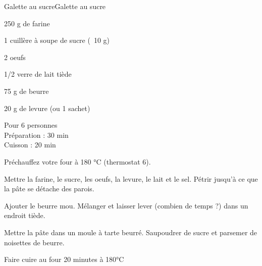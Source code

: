 \begin{recette}{Galette au sucre}{Galette au sucre}

\begin{ingredients}
250 g de farine\par
1 cuillère à soupe de sucre (~10 g)\par
2 oeufs\par
1/2 verre de lait tiède\par
75 g de beurre\par
20 g de levure (ou 1 sachet)\par
\end{ingredients}

\begin{infos}
Pour 6 personnes\\
Préparation : 30 min\\
Cuisson : 20 min\\
\end{infos}

\begin{etapes}
\item Préchauffez votre four à 180 °C (thermostat 6).
\item Mettre la farine, le sucre, les oeufs, la levure, le lait et le sel. Pétrir jusqu'à ce que la pâte se détache des parois.
\item Ajouter le beurre mou. Mélanger et laisser lever (combien de temps ?) dans un endroit tiède.
\item Mettre la pâte dans un moule à tarte beurré. Saupoudrer de sucre et parsemer de noisettes de beurre.
\item Faire cuire au four 20 minutes à 180°C
\end{etapes}

\end{recette}